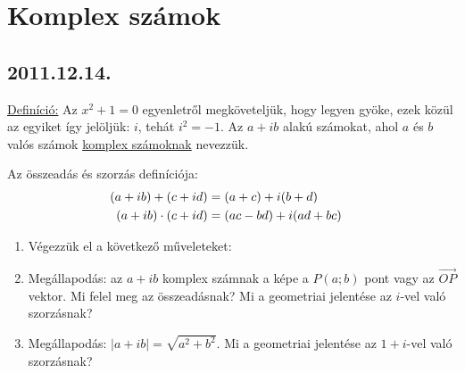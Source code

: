\section{Komplex számok}

\subsection*{2011.12.14.}

\underline{Definíció:} Az $x^2+1=0$ egyenletről megköveteljük, hogy legyen gyöke, ezek közül az egyiket így jelöljük: $i$, tehát $i^2=-1$. Az $a+ib$ alakú számokat, ahol $a$ és $b$ valós számok \underline{komplex számoknak} nevezzük.

Az összeadás és szorzás definíciója:
\begin{align*}
(a+ib)+(c+id)&=(a+c)+i(b+d)\cr
(a+ib)\cdot(c+id)&=(ac-bd)+i(ad+bc)
\end{align*}

\begin{enumerate}
\item Végezzük el a következő műveleteket:
\item Megállapodás: az $a+ib$ komplex számnak a képe a $P(a;b)$ pont vagy az $\overrightarrow{OP}$ vektor. Mi felel meg az összeadásnak? Mi a geometriai jelentése az $i$-vel való szorzásnak?
\item Megállapodás: $|a+ib|=\sqrt{a^2+b^2}$. Mi a geometriai jelentése az $1+i$-vel való szorzásnak?
\end{enumerate}

